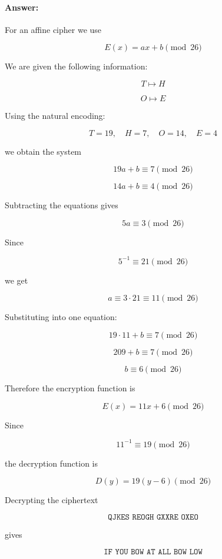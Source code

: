 \documentclass[]{scrartcl}
\begin{document}
\paragraph{Answer:} {For an affine cipher we use

\[
E(x)=ax+b \pmod{26}
\]

We are given the following information:

\[
T \mapsto H
\]

\[
O \mapsto E
\]

Using the natural encoding:

\[
T=19,\quad H=7,\quad O=14,\quad E=4
\]

we obtain the system

\[
19a+b \equiv 7 \pmod{26}
\]

\[
14a+b \equiv 4 \pmod{26}
\]

Subtracting the equations gives

\[
5a \equiv 3 \pmod{26}
\]

Since

\[
5^{-1}\equiv 21 \pmod{26}
\]

we get

\[
a \equiv 3\cdot21 \equiv 11 \pmod{26}
\]

Substituting into one equation:

\[
19\cdot11+b \equiv 7 \pmod{26}
\]

\[
209+b \equiv 7 \pmod{26}
\]

\[
b \equiv 6 \pmod{26}
\]

Therefore the encryption function is

\[
E(x)=11x+6 \pmod{26}
\]

Since

\[
11^{-1}\equiv 19 \pmod{26}
\]

the decryption function is

\[
D(y)=19(y-6)\pmod{26}
\]

Decrypting the ciphertext

\[
\texttt{QJKES REOGH GXXRE OXEO}
\]

gives

\[
\texttt{IF YOU BOW AT ALL BOW LOW}
\]}
\end{document}
